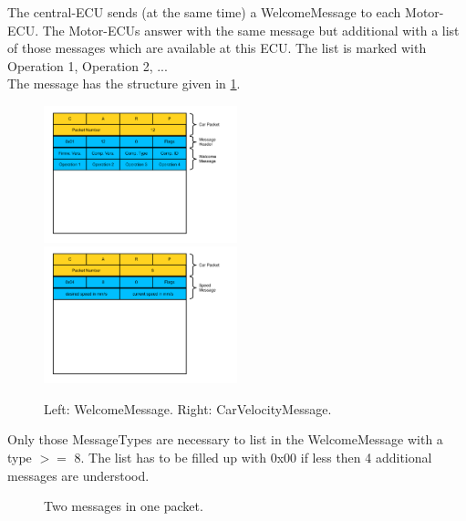 The central-ECU sends (at the same time) a WelcomeMessage to each Motor-ECU. The Motor-ECUs
answer with the same message but additional with a list of those messages which are available
at this ECU. The list is marked with Operation 1, Operation 2, ...\\

The message has the structure given in \ref{WelcomeMessage}.

\begin{figure}[ht]
	\includegraphics[width=0.5\textwidth]{figures/prot2.pdf}
	\includegraphics[width=0.5\textwidth]{figures/prot3.pdf}
	\caption{Left: WelcomeMessage. Right: CarVelocityMessage.} \label{WelcomeMessage}
\end{figure}

Only those MessageTypes are necessary to list in the WelcomeMessage with a type $>=$ 8.
The list has to be filled up with 0x00 if less then 4 additional messages are understood.

\begin{figure}[ht] 
	\caption{Two messages in one packet.} \label{example}
\end{figure}

